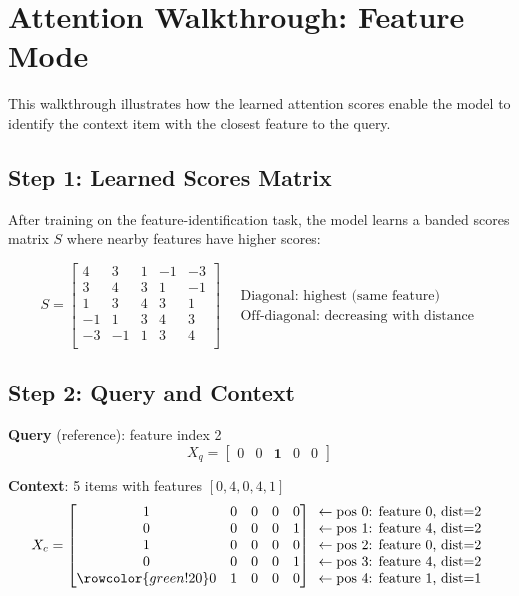 \documentclass[12pt]{article}
\begin{document}
\section*{Attention Walkthrough: Feature Mode}

This walkthrough illustrates how the learned attention scores enable the model to identify the context item with the closest feature to the query.

\subsection*{Step 1: Learned Scores Matrix}

After training on the feature-identification task, the model learns a banded scores matrix $S$ where nearby features have higher scores:

\[
S = \begin{bmatrix}
 4 &  3 &  1 & -1 & -3 \\
 3 &  4 &  3 &  1 & -1 \\
 1 &  3 &  4 &  3 &  1 \\
-1 &  1 &  3 &  4 &  3 \\
-3 & -1 &  1 &  3 &  4 \\
\end{bmatrix}
\quad
\begin{array}{l}
\text{Diagonal: highest (same feature)} \\
\text{Off-diagonal: decreasing with distance}
\end{array}
\]

\subsection*{Step 2: Query and Context}

\textbf{Query} (reference): feature index 2
\[
X_q = \begin{bmatrix} 0 & 0 & \mathbf{1} & 0 & 0 \end{bmatrix}
\]

\textbf{Context}: 5 items with features $[0, 4, 0, 4, 1]$
\[
X_c = \begin{bmatrix}
1 & 0 & 0 & 0 & 0 \\
0 & 0 & 0 & 0 & 1 \\
1 & 0 & 0 & 0 & 0 \\
0 & 0 & 0 & 0 & 1 \\
\rowcolor{green!20} 0 & 1 & 0 & 0 & 0 \\
\end{bmatrix}
\begin{array}{l}
\leftarrow \text{pos 0: feature 0, dist=2} \\
\leftarrow \text{pos 1: feature 4, dist=2} \\
\leftarrow \text{pos 2: feature 0, dist=2} \\
\leftarrow \text{pos 3: feature 4, dist=2} \\
\leftarrow \text{pos 4: feature 1, dist=1} \\
\end{array}
\]
\end{document}

